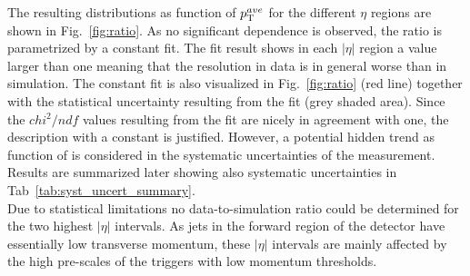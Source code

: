  The resulting distributions as function of $p_{\text{T}}^{ave}$ for the different $\eta$ regions are shown in Fig.~\ref{fig:ratio}. As no significant \pt dependence is observed, the ratio is parametrized by a constant fit. The fit result shows in each $|\eta|$ region a value larger than one meaning that the resolution in data is in general worse than in simulation. The constant fit is also visualized in Fig.~\ref{fig:ratio} (red line) together with the statistical uncertainty resulting from the fit (grey shaded area). Since the $chi^2/ndf$ values resulting from the fit are nicely in agreement with one, the description with a constant is justified. However, a potential hidden trend as function of \ptave is considered in the systematic uncertainties of the measurement. Results are summarized later showing also systematic uncertainties in Tab~\ref{tab:syst_uncert_summary}. \\
Due to statistical limitations no data-to-simulation ratio could be determined for the two highest $|\eta|$ intervals. As jets in the forward region of the detector have essentially low transverse momentum, these $|\eta|$ intervals are mainly affected by the high pre-scales of the triggers with low momentum thresholds.   
 
